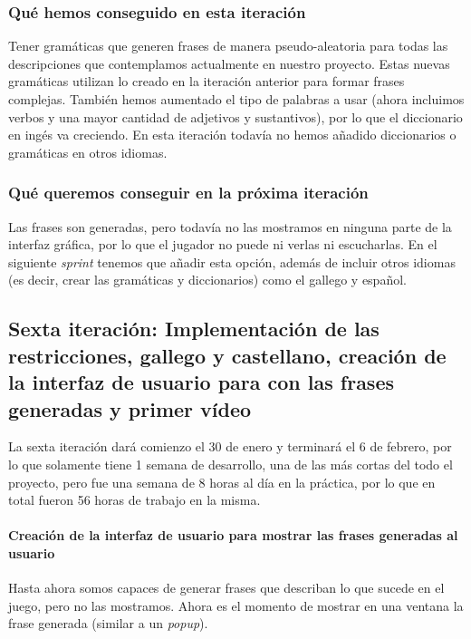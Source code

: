 \subsubsection{Qué hemos conseguido en esta iteración}

Tener gramáticas que generen frases de manera pseudo-aleatoria para todas las descripciones que contemplamos actualmente en nuestro proyecto. Estas nuevas gramáticas utilizan lo creado en la iteración anterior para formar frases complejas. También hemos aumentado el tipo de palabras a usar (ahora incluimos verbos y una mayor cantidad de adjetivos y sustantivos), por lo que el diccionario en ingés va creciendo. En esta iteración todavía no hemos añadido diccionarios o gramáticas en otros idiomas.

\subsubsection{Qué queremos conseguir en la próxima iteración}

Las frases son generadas, pero todavía no las mostramos en ninguna parte de la interfaz gráfica, por lo que el jugador no puede ni verlas ni escucharlas. En el siguiente \textit{sprint} tenemos que añadir esta opción, además de incluir otros idiomas (es decir, crear las gramáticas y diccionarios) como el gallego y español.

\subsection{Sexta iteración: Implementación de las restricciones, gallego y castellano, creación de la interfaz de usuario para con las frases generadas y primer vídeo}

La sexta iteración dará comienzo el 30 de enero y terminará el 6 de febrero, por lo que solamente tiene 1 semana de desarrollo, una de las más cortas del todo el proyecto, pero fue una semana de 8 horas al día en la práctica, por lo que en total fueron 56 horas de trabajo en la misma.

\paragraph{Creación de la interfaz de usuario para mostrar las frases generadas al usuario} Hasta ahora somos capaces de generar frases que describan lo que sucede en el juego, pero no las mostramos. Ahora es el momento de mostrar en una ventana la frase generada (similar a un \textit{popup}).

